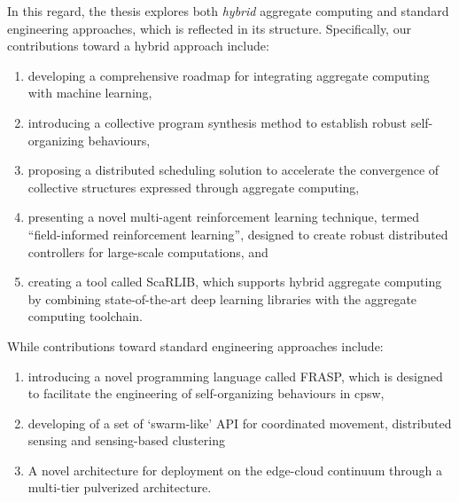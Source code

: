 In this regard, the thesis explores both \emph{hybrid} aggregate computing and standard engineering approaches, which is reflected in its structure. Specifically, our contributions toward a hybrid approach include:
\begin{enumerate}
    \item developing a comprehensive roadmap for integrating aggregate computing with machine learning,
    \item introducing a collective program synthesis method to establish robust self-organizing behaviours,
    \item proposing a distributed scheduling solution to accelerate the convergence of collective structures expressed through aggregate computing,
    \item presenting a novel multi-agent reinforcement learning technique, termed ``field-informed reinforcement learning'', designed to create robust distributed controllers for large-scale computations, and
    \item creating a tool called ScaRLIB, which supports hybrid aggregate computing by combining state-of-the-art deep learning libraries with the aggregate computing toolchain.
\end{enumerate}
While  contributions toward standard engineering approaches include:
\begin{enumerate}
    \item introducing a novel programming language called FRASP, 
    which is designed to facilitate the engineering of self-organizing behaviours in \ac{cpsw},
    \item developing of a set of `swarm-like' API for coordinated movement, distributed sensing and sensing-based clustering
    \item A novel architecture for deployment on the edge-cloud continuum through a multi-tier pulverized architecture.
\end{enumerate}
